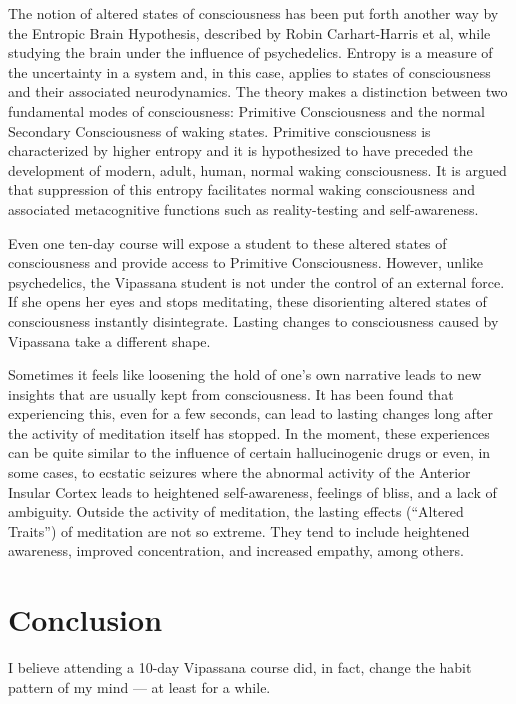 \documentclass[a4paper, amsfonts, amssymb, amsmath, reprint, showkeys, nofootinbib, twoside]{revtex4-1}
\begin{document}
The notion of altered states of consciousness has been put forth another way by the
Entropic Brain Hypothesis, described by Robin Carhart-Harris et al, while studying
the brain under the influence of psychedelics. \cite{entropic,entropicrevisited} Entropy is a measure of the
uncertainty in a system and, in this case, applies
to states of consciousness and their associated neurodynamics. The theory makes a
distinction between
two fundamental modes of consciousness: Primitive Consciousness and the normal Secondary
Consciousness of waking states.
Primitive consciousness is characterized by higher entropy and it is hypothesized to have
preceded the development of modern, adult, human, normal waking consciousness.
It is argued that suppression of this entropy facilitates normal waking consciousness
and associated metacognitive functions such as reality-testing and self-awareness.

Even one ten-day course will expose a student to these altered states of
consciousness and provide access to Primitive Consciousness. However, unlike
psychedelics, the Vipassana student is not under the control of an external force. If
she opens her eyes and stops meditating, these disorienting altered states of
consciousness instantly disintegrate. Lasting changes to consciousness caused by
Vipassana take a different shape.

Sometimes it feels like loosening the hold of one's own narrative leads to new insights that are
usually kept from consciousness. It has been found that experiencing this, even for a
few seconds, can lead to lasting changes long after the activity of meditation itself
has stopped. \cite{alteredtraits} In the moment, these experiences can be quite
similar to the influence of certain hallucinogenic drugs or even, in some cases, to ecstatic
seizures where the abnormal activity of the Anterior Insular Cortex leads to
heightened self-awareness, feelings of bliss, and a lack of
ambiguity. \cite{cortexbliss} Outside the activity of meditation, the lasting effects
(``Altered Traits'') of meditation are not so extreme. They tend to include
heightened awareness, improved concentration, and increased empathy, among
others. \cite{alteredtraits}

\section{Conclusion}

I believe attending a 10-day Vipassana course did, in fact, change the habit pattern
of my mind --- at least for a while.
\end{document}
